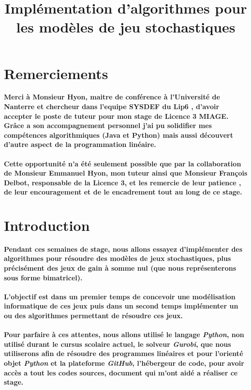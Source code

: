 \documentclass[a4paper, 12pt, twoside]{article}
\title{Implémentation d'algorithmes pour les modèles de jeu stochastiques}
\begin{document}
\pagedegarde

\newpage

\tableofcontents
\newpage
\section*{Remerciements}
\paragraph{Merci à Monsieur Hyon, maitre de conférence à l'Université de Nanterre et chercheur dans l'equipe SYSDEF du Lip6 , d'avoir accepter le poste de tuteur pour mon stage de Licence 3 MIAGE. Grâce a son accompagnement personnel j'ai pu solidifier mes compétences algorithmiques (Java et Python) mais aussi découvert d'autre aspect de la programmation linéaire. }

\paragraph{Cette opportunité n'a été seulement possible que par la collaboration de Monsieur Emmanuel Hyon, mon tuteur ainsi que Monsieur François Delbot, responsable de la Licence 3, et les remercie de leur patience , de leur encouragement et de le encadrement tout au long de ce stage. }
\newpage 
\section{Introduction}
\paragraph{Pendant ces semaines de stage, nous allons essayez d'implémenter des algorithmes pour résoudre des modèles de jeux stochastiques, plus précisément des jeux  de gain à somme nul (que nous représenterons sous forme bimatricel).} 
\paragraph{L'objectif est dans un premier temps de concevoir une modélisation informatique de ces jeux puis dans un second temps implémenter un ou des algorithmes permettant de résoudre ces jeux.}
\paragraph{Pour parfaire à ces attentes, nous allons utilisé le langage \textit{Python}, non utilisé durant le cursus scolaire actuel, le solveur \textit{Gurobi}, que nous utiliserons afin de résoudre des programmes linéaires et pour l'orienté objet \textit{Python} et la plateforme \textit{GitHub}, l'hébergeur de code, pour avoir accès a tout les codes sources, document qui m'ont aidé a réaliser ce stage.}
\end{document}
